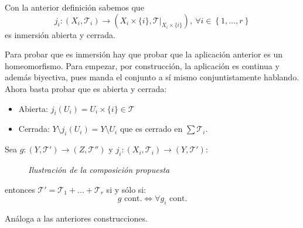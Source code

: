 \begin{prop}
Con la anterior definición sabemos que 
\[
j_i: \left( X_i, \mathcal{T}_i \right) \rightarrow \left( X_i\times \{i\}, \mathcal{T}|_{X_i \times \{i\}} \right),\ \forall i \in \left\{ 1, \ldots, r \right\}
\]
es inmersión abierta y cerrada.
\end{prop}
\begin{demo}
Para probar que es inmersión hay que probar que la aplicación anterior es un homeomorfismo. Para empezar, por construcción, la aplicación es continua y además biyectiva, pues manda el conjunto a sí mismo conjuntistamente hablando. Ahora basta probar que es abierta y cerrada:
\begin{itemize}
    \item Abierta: $j_i\left( U_i \right) = U_i \times \{i\} \in \mathcal{T}$
    \item Cerrada: $Y\setminus j_i\left( U_i \right) = Y \setminus U_i$ que es cerrado en $\sum \mathcal{T}_i$.
\end{itemize}
\end{demo}

\begin{theo}
Sea $g: \left( Y, \mathcal{T}' \right) \rightarrow \left( Z, \mathcal{T}'' \right)$ y $j_i: \left( X_i, \mathcal{T}_i \right) \rightarrow \left( Y, \mathcal{T}' \right)$:
    \begin{figure}[H]
        \centering    
        \caption{\textit{Ilustración de la composición propuesta}}
        \label{prop_universal_sum_finitas}
    \end{figure}

entonces $\mathcal{T}' = \mathcal{T}_1 + \ldots + \mathcal{T}_r$ si y sólo si:
\[
g \text{ cont.} \Leftrightarrow \forall g_i \text{ cont.}
\]
\end{theo}
\begin{demo}
    Análoga a las anteriores construcciones.
\end{demo}

